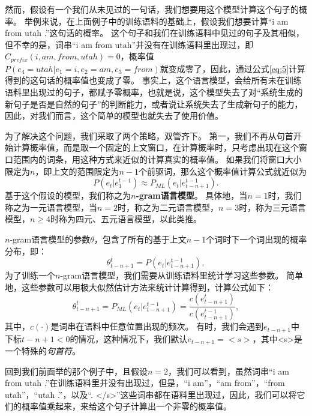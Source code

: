 \documentclass[10pt,a4paper]{ctexart}
\begin{document}
然而，假设有一个我们从未见过的一句话，我们想要用这个模型计算这个句子的概率。
举例来说，在上面例子中的训练语料的基础上，假设我们想要计算“i am from utah .”这句话的概率。
这个句子和我们在训练语料中见过的句子及其相似，但不幸的是，词串“i am from utah”并没有在训练语料里出现过，即$C_{prefix}(i,am,from,utah)=0$，概率值$P(e_4=utah|e_1=i,e_2=am,e_3=from)$就变成零了，因此，通过公式\ref{eq:5}计算得到的这句话的概率值也变成了零。
事实上，这个语言模型，会给所有未在训练语料里出现过的句子，都赋予零概率，也就是说，这个模型失去了对“系统生成的新句子是否是自然的句子”的判断能力，或者说让系统失去了生成新句子的能力，因此，对我们而言，这个简单的模型也就失去了使用价值。

为了解决这个问题，我们采取了两个策略，双管齐下。
第一，我们不再从句首开始计算概率值，而是取一个固定的上文窗口，在计算概率时，只考虑出现在这个窗口范围内的词条，用这种方式来近似的计算真实的概率值。
如果我们将窗口大小限定为$n$，即上文的范围限定为$n-1$个前驱词，那么这个概率值计算公式就近似为
\begin{equation}\label{eq:6}
  P(e_t|e_1^{t-1}) \approx P_{ML}(e_t|e_{t-n+1}^{t-1}).
\end{equation}
基于这个假设的模型，我们称之为\textbf{$n$-gram语言模型}。
具体地，当$n=1$时，我们称之为一元语言模型，当$n=2$时，称之为二元语言模型，$n=3$时，称为三元语言模型，$n \geq 4$时称为四元、五元语言模型，以此类推。

$n$-gram语言模型的参数$\theta$，包含了所有的基于上文$n-1$个词时下一个词出现的概率分布，即：
\begin{equation}\label{eq:7}
  \theta_{t-n+1}^{t} = P(e_t | e_{t-n+1}^{t-1}),
\end{equation}
为了训练一个$n$-gram语言模型，我们需要从训练语料里统计学习这些参数。
简单地，这些参数可以用极大似然估计方法来统计计算得到，计算公式如下：
\begin{equation}\label{eq:8}
  \theta_{t-n+1}^{t} = P_{ML}(e_t | e_{t-n+1}^{t-1}) = \frac{c(e_{t-n+1}^{t})}{c(e_{t-n+1}^{t-1})},
\end{equation}
其中，$c(\cdot)$是词串在语料中任意位置出现的频次。
有时，我们会遇到$e_{t-n+1}$中下标$t-n+1<0$的情况，这种情况下，我们默认$e_{t-n+1}=<s>$，其中<s>是一个特殊的\textit{句首符}。

回到我们前面举的那个例子中，且假设$n=2$，我们可以看到，虽然词串“i am from utah .”在训练语料里并没有出现过，但是，“i am”，“am from”，“from utah”，“utah .”，以及“. </s>”这些词串都在语料里出现过，因此，我们可以将它们的概率值乘起来，来给这个句子计算出一个非零的概率值。
\end{document}
